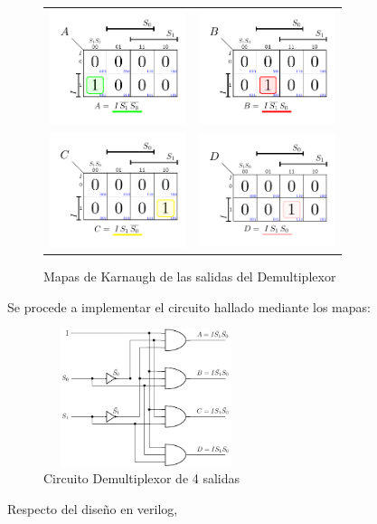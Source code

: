\begin{figure}[H]
   \centering
\begin{tabular}{cc}
\includegraphics[width=4cm,trim={0.5cm 0.5cm  0.25cm 0.25cm},clip]{Ejercicio_3/Karnaugh/DEMUX/Salida_A.pdf}&
\includegraphics[width=4cm,trim={0.5cm 0.5cm  0.25cm 0.25cm},clip]{Ejercicio_3/Karnaugh/DEMUX/Salida_B.pdf}\\
\includegraphics[width=4cm,trim={0.45cm 0.5cm  0.25cm 0.25cm},clip]{Ejercicio_3/Karnaugh/DEMUX/Salida_C.pdf}&
\includegraphics[width=4cm,trim={0.5cm 0.5cm  0.25cm 0.25cm},clip]{Ejercicio_3/Karnaugh/DEMUX/Salida_D.pdf}\\
\end{tabular}
    \caption{Mapas de Karnaugh de las salidas del Demultiplexor}
    \label{fig:Karnaughs_DEMUX} 
\end{figure}

Se procede a implementar el circuito hallado mediante los mapas:
\begin{figure}[H]
\centering
\includegraphics[width=6cm,height=4cm]{Ejercicio_3/Circuitos/Circuito_DEMUX.pdf}
\caption{Circuito Demultiplexor de 4 salidas}
\label{fig:Circuito_DEMUX}
\end{figure}
Respecto del diseño en verilog,

